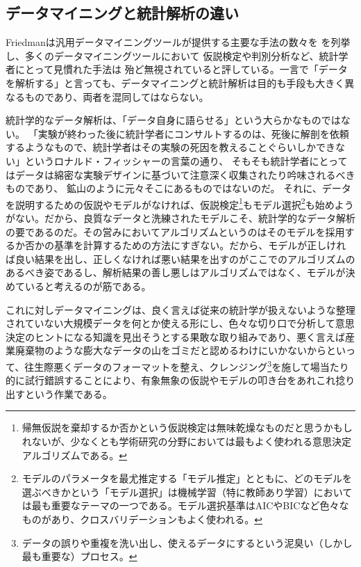 \subsection{データマイニングと統計解析の違い}
Friedmanは汎用データマイニングツールが提供する主要な手法の数々を
を列挙し、多くのデータマイニングツールにおいて
仮説検定や判別分析など、統計学者にとって見慣れた手法は
殆ど無視されていると評している。一言で「データを解析する」と言っても、データマイニングと統計解析は目的も手段も大きく異なるものであり、両者を混同してはならない。

統計学的なデータ解析は、「データ自身に語らせる」という大らかなものではない。
「実験が終わった後に統計学者にコンサルトするのは、死後に解剖を依頼するようなもので、統計学者はその実験の死因を教えることぐらいしかできない」というロナルド・フィッシャーの言葉の通り、
そもそも統計学者にとってはデータは綿密な実験デザインに基づいて注意深く収集されたり吟味されるべきものであり、
鉱山のように元々そこにあるものではないのだ。
それに、データを説明するための仮説やモデルがなければ、仮説検定\footnote{帰無仮説を棄却するか否かという仮説検定は無味乾燥なものだと思うかもしれないが、少なくとも学術研究の分野においては最もよく使われる意思決定アルゴリズムである。}もモデル選択\footnote{モデルのパラメータを最尤推定する「モデル推定」とともに、どのモデルを選ぶべきかという「モデル選択」は機械学習（特に教師あり学習）においては最も重要なテーマの一つである。モデル選択基準はAICやBICなど色々なものがあり、クロスバリデーションもよく使われる。}も始めようがない。だから、良質なデータと洗練されたモデルこそ、統計学的なデータ解析の要であるのだ。その営みにおいてアルゴリズムというのはそのモデルを採用するか否かの基準を計算するための方法にすぎない。だから、モデルが正しければ良い結果を出し、正しくなければ悪い結果を出すのがここでのアルゴリズムのあるべき姿であるし、解析結果の善し悪しはアルゴリズムではなく、モデルが決めていると考えるのが筋である。

これに対しデータマイニングは、良く言えば従来の統計学が扱えないような整理されていない大規模データを何とか使える形にし、色々な切り口で分析して意思決定のヒントになる知識を見出そうとする果敢な取り組みであり、悪く言えば産業廃棄物のような膨大なデータの山をゴミだと認めるわけにいかないからといって、往生際悪くデータのフォーマットを整え、クレンジング\footnote{データの誤りや重複を洗い出し、使えるデータにするという泥臭い（しかし最も重要な）プロセス。}を施して場当たり的に試行錯誤することにより、有象無象の仮説やモデルの叩き台をあれこれ捻り出すという作業である。

